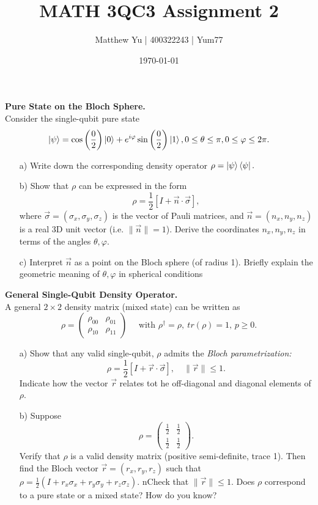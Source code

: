 \documentclass{article}
\renewcommand{\phi}{\varphi}
\begin{document}
\title{MATH 3QC3 Assignment 2}
\author{Matthew Yu | 400322243 | Yum77}
\date{\today}
\maketitle

\begin{question}
    \textbf{Pure State on the Bloch Sphere.}\\
    Consider the single-qubit pure state $$\ket{\psi}=\cos \left( \frac{0}{2} \right) \ket{0} + e^{i\phi}\sin \left(\frac{0}{2} \right) \ket{1},    0 \leq \theta \leq \pi , 0 \leq \phi \leq 2\pi.$$
    \begin{enumerate}
        \item[a)] Write down the corresponding density operator $\rho=\ket{\psi}\bra{\psi}.$
        \item[b)] Show that $\rho$ can be expressed in the form $$\rho=\frac{1}{2}\left[I + \vec{n} \cdot \vec{\sigma} \right],$$ where $\vec{\sigma}=(\sigma_x,\sigma_y,\sigma_z)$ is the vector of Pauli matrices, and $\vec{n}=(n_x,n_y,n_z)$ is a real 3D unit vector (i.e. $\|\vec{n}\|=1$). Derive the coordinates $n_x,n_y,n_z$ in terms of the angles $\theta, \phi$.
        \item[c)] Interpret $\vec{n}$ as a point on the Bloch sphere (of radius 1). Briefly explain the geometric meaning of $\theta,\phi$ in spherical conditions 
    \end{enumerate}
\end{question}

\begin{question}
    \textbf{General Single-Qubit Density Operator.}\\
    A general $2 \times 2$ density matrix (mixed state) can be written as
    $$ \rho =\begin{pmatrix}
        \rho_{00} & \rho_{01} \\
        \rho_{10} & \rho_{11}
    \end{pmatrix} \quad \text{ with } \rho^\dagger=\rho, \ tr(\rho)=1, \, p \geq 0.$$
    \begin{enumerate}
        \item[a)] Show that any valid single-qubit, $\rho$ admits the \textit{Bloch parametrization:} $$\rho=\frac{1}{2}\left[I+\vec{r} \cdot\vec{\sigma}\right], \quad \|\vec{r}\| \leq 1.$$ Indicate how the vector $\vec{r}$ relates tot he off-diagonal and diagonal elements of $\rho$.
        \item[b)] Suppose  
        $$ \rho =\begin{pmatrix}
        \frac{1}{2} & \frac{1}{2} \\
        \frac{1}{2} & \frac{1}{2}
        \end{pmatrix}.$$ Verify that $\rho$ is a valid density matrix (positive semi-definite, trace 1). Then find the Bloch vector $\vec{r}=(r_x,r_y,r_z)$ such that $\rho=\frac{1}{2}(I+r_x\sigma_x+r_y\sigma_y+r_z\sigma_z).$ nCheck that $\|\vec{r}\| \leq1.$ Does $\rho$ correspond to a pure state or a mixed state? How do you know?
    \end{enumerate}
\end{question}
\end{document}
